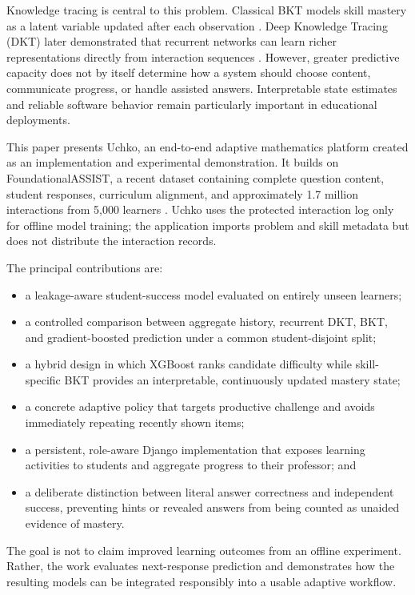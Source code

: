 \documentclass[conference]{IEEEtran}
\begin{document}
Knowledge tracing is central to this problem. Classical BKT models skill mastery as a latent variable updated after each observation \cite{corbett1994knowledge}. Deep Knowledge Tracing (DKT) later demonstrated that recurrent networks can learn richer representations directly from interaction sequences \cite{piech2015dkt}. However, greater predictive capacity does not by itself determine how a system should choose content, communicate progress, or handle assisted answers. Interpretable state estimates and reliable software behavior remain particularly important in educational deployments.

This paper presents Uchko, an end-to-end adaptive mathematics platform created as an implementation and experimental demonstration. It builds on FoundationalASSIST, a recent dataset containing complete question content, student responses, curriculum alignment, and approximately 1.7 million interactions from 5,000 learners \cite{worden2026foundationalassist}. Uchko uses the protected interaction log only for offline model training; the application imports problem and skill metadata but does not distribute the interaction records.

The principal contributions are:
\begin{itemize}
    \item a leakage-aware student-success model evaluated on entirely unseen learners;
    \item a controlled comparison between aggregate history, recurrent DKT, BKT, and gradient-boosted prediction under a common student-disjoint split;
    \item a hybrid design in which XGBoost ranks candidate difficulty while skill-specific BKT provides an interpretable, continuously updated mastery state;
    \item a concrete adaptive policy that targets productive challenge and avoids immediately repeating recently shown items;
    \item a persistent, role-aware Django implementation that exposes learning activities to students and aggregate progress to their professor; and
    \item a deliberate distinction between literal answer correctness and independent success, preventing hints or revealed answers from being counted as unaided evidence of mastery.
\end{itemize}

The goal is not to claim improved learning outcomes from an offline experiment. Rather, the work evaluates next-response prediction and demonstrates how the resulting models can be integrated responsibly into a usable adaptive workflow.
\end{document}
